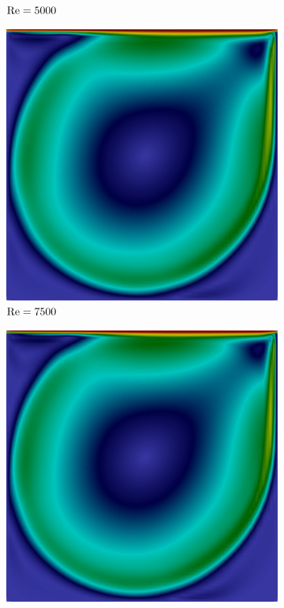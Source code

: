 \begin{figure}[h!]
\begin{subfigure}{0.32\textwidth}
        \caption{$\mathrm{Re}=5000$}
    \end{subfigure}
    \begin{subfigure}{0.32\textwidth}
        \includegraphics[width=\linewidth]{Figuras/Cavity/Re7500.png}
        \caption{$\mathrm{Re}=7500$}
    \end{subfigure}
    \begin{subfigure}{0.32\textwidth}
        \includegraphics[width=\linewidth]{Figuras/Cavity/Re10000.png}

\end{subfigure}
\end{figure}
